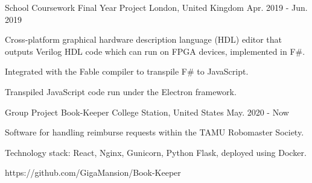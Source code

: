 \begin{cventries}
    \cventry
    {School Coursework} %
    {Final Year Project} %
    {London, United Kingdom} %
    {Apr. 2019 - Jun. 2019} %
    {
      \begin{cvitems} %
        \item {Cross-platform graphical hardware description language (HDL) editor that outputs Verilog HDL code which can run on FPGA devices, implemented in F\#.}
        \item {Integrated with the Fable compiler to transpile F\# to JavaScript.}
        \item {Transpiled JavaScript code run under the Electron framework.}
      \end{cvitems}
    }
    
    \cventry
    {Group Project}
    {Book-Keeper}
    {College Station, United States}
    {May. 2020 - Now}
    {
        \begin{cvitems}
            \item Software for handling reimburse requests within the TAMU Robomaster Society.
            \item Technology stack: React, Nginx, Gunicorn, Python Flask, deployed using Docker.
            \item https://github.com/GigaMansion/Book-Keeper
        \end{cvitems}
    }

\end{cventries}